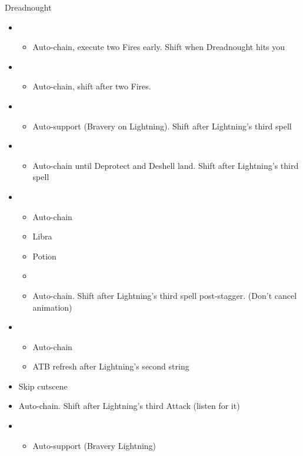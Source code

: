 \begin{paracol}{2}
	\switchcolumn
	\begin{battle}{Dreadnought}
		\begin{itemize}
			\item \fourth
			      \begin{itemize}
				      \item Auto-chain, execute two Fires early. Shift when Dreadnought hits you
			      \end{itemize}
			\item \fifth
			      \begin{itemize}
				      \item Auto-chain, shift after two Fires.
			      \end{itemize}
			\item \sixth
			      \begin{itemize}
				      \item Auto-support (Bravery on Lightning). Shift after Lightning’s third spell
			      \end{itemize}
			\item \fourth
			      \begin{itemize}
				      \item Auto-chain until Deprotect and Deshell land. Shift after Lightning’s third spell
			      \end{itemize}
			\item \fifth
			      \begin{itemize}
				      \item Auto-chain
				      \item Libra
				      \item Potion
				      \item \stagger
				      \item Auto-chain. Shift after Lightning’s third spell post-stagger. (Don't cancel animation)
			      \end{itemize}
			\item \first
			      \begin{itemize}
				      \item Auto-chain
				      \item ATB refresh after Lightning's second string
			      \end{itemize}
			\item Skip cutscene
			\item Auto-chain. Shift after Lightning’s third Attack (listen for it)
			\item \sixth
			      \begin{itemize}
				      \item Auto-support (Bravery Lightning)

\end{itemize}
\end{itemize}
\end{battle}
\end{paracol}
